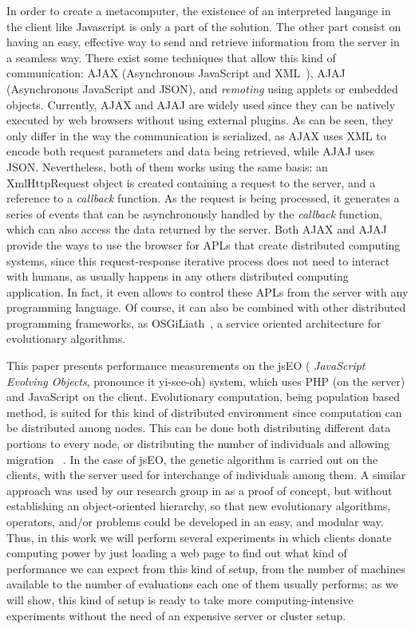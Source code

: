 \documentclass[runningheads,a4paper]{llncs}
\begin{document}
In order to create a metacomputer, the existence of an interpreted language in the client like Javascript is only a part of the solution. The other part consist on having an easy, effective way to send and retrieve information from the server in a seamless way. There exist some techniques that allow this kind of communication: AJAX (Asynchronous JavaScript and
XML~\cite{brinzarea2010ajax}), AJAJ (Asynchronous JavaScript and JSON), and {\em remoting} using
applets or embedded objects. Currently, AJAX and AJAJ are widely used since they can be natively executed by web browsers without using external plugins. As can be seen, they only differ in the way the communication is serialized, as AJAX uses XML\cite{goldberg2009xml} to encode both request parameters and data being retrieved, while AJAJ uses JSON. Nevertheless, both of them works using the same basis: an {\sf XmlHttpRequest} object is created  containing a request to the server, and a reference to a {\em callback} function. 
As the request is being processed, it generates a series of events that can be asynchronously handled by the {\em callback} function, which can also access the data returned by the server.
Both AJAX and AJAJ provide the ways to use the browser for APLs that create distributed computing systems, since this request-response iterative process does not need to interact with humans, as usually happens in any others distributed computing application.
In fact, it even allows to control these APLs from the server with any programming
language. Of course, it can also be combined with other distributed
programming frameworks, as OSGiLiath~\cite{DBLP:journals/soco/Garcia-SanchezGCAG13}, a service oriented architecture for evolutionary algorithms.


This paper presents performance measurements on the jsEO ({\em
  JavaScript Evolving Objects}, pronounce it yi-see-oh) system, which uses PHP 
 (on the server) and JavaScript on the client. Evolutionary computation, being population based method, is suited for this
kind of distributed environment since computation can be distributed among nodes. This can be done both distributing different data portions to every node, or distributing the number of individuals and allowing migration ~\cite{cantu-paz:migration-policies}. In the case of jsEO, the genetic algorithm is carried out  on the clients,
with the server used  for interchange of individuals among
them. A similar approach was used by our research group in \cite{agajaj} as a proof of concept, but without establishing an object-oriented hierarchy, so that new evolutionary algorithms, operators, and/or problems could be developed in an easy, and modular way.
Thus, in this work we will perform several experiments in which clients donate
computing power by just loading a web page to find out what kind of
performance we can expect from this kind of setup, from the number of
machines available to the number of evaluations each one of them
usually performs; as we will show, this kind of setup is ready to take more
computing-intensive experiments without the need of an expensive server or cluster
setup. 
\end{document}
